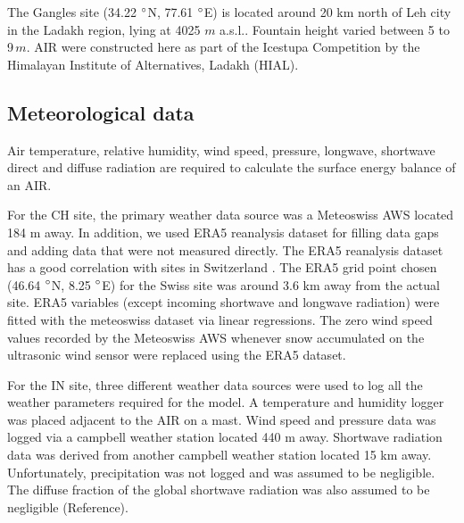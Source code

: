 \documentclass[utf8]{frontiersSCNS} %
\begin{document}
The Gangles site (34.22 $\degree$N, 77.61 $\degree$E) is located around 20 km north of Leh city in the Ladakh
region, lying at 4025 $m$ a.s.l.. Fountain height varied between 5 to 9\,$m$. AIR were constructed here as part of
the Icestupa Competition  by the Himalayan Institute of Alternatives, Ladakh (HIAL).

\subsection{Meteorological data}

Air temperature, relative humidity, wind speed, pressure, longwave, shortwave direct and diffuse radiation are required
to calculate the surface energy balance of an AIR.

For the CH site, the primary weather data source was a Meteoswiss AWS located 184 m away. In addition, we used ERA5
reanalysis dataset \citep{era5} for filling data gaps and adding data that were not measured directly.  The ERA5
reanalysis dataset has a good correlation with sites in Switzerland \citep{Scherrer_2020}. The ERA5 grid point
chosen (46.64 $\degree$N, 8.25 $\degree$E) for the Swiss site was around 3.6 km away from the actual site.  ERA5
variables (except incoming shortwave and longwave radiation) were fitted with the meteoswiss dataset via linear
regressions. The zero wind speed values recorded by the Meteoswiss AWS whenever snow accumulated on the ultrasonic
wind sensor were replaced using the ERA5 dataset.

For the IN site, three different weather data sources were used to log all the weather parameters required for the
model. A temperature and humidity logger was placed adjacent to the AIR on a mast. Wind speed and pressure data was
logged via a campbell weather station located 440 m away. Shortwave radiation data was derived from another campbell
weather station located 15 km away. Unfortunately, precipitation was not logged and was assumed to be negligible. The
diffuse fraction of the global shortwave radiation was also assumed to be negligible (Reference).
\end{document}
